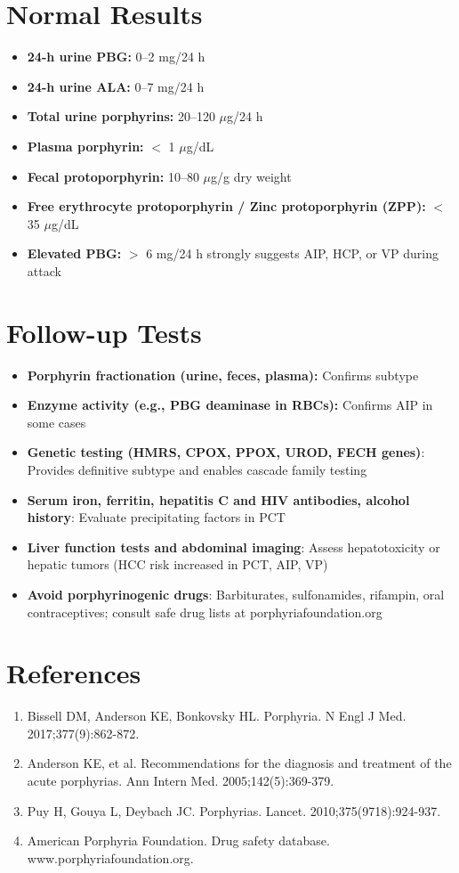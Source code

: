 \section*{Normal Results}
\begin{itemize}
  \item \textbf{24-h urine PBG:} 0--2 mg/24 h
  \item \textbf{24-h urine ALA:} 0--7 mg/24 h
  \item \textbf{Total urine porphyrins:} 20--120 $\mu$g/24 h
  \item \textbf{Plasma porphyrin:} $<$ 1 $\mu$g/dL
  \item \textbf{Fecal protoporphyrin:} 10--80 $\mu$g/g dry weight
  \item \textbf{Free erythrocyte protoporphyrin / Zinc protoporphyrin (ZPP):} $<$ 35 $\mu$g/dL
  \item \textbf{Elevated PBG:} $>$ 6 mg/24 h strongly suggests AIP, HCP, or VP during attack
\end{itemize}

\section*{Follow-up Tests}
\begin{itemize}
  \item \textbf{Porphyrin fractionation (urine, feces, plasma):} Confirms subtype
  \item \textbf{Enzyme activity (e.g., PBG deaminase in RBCs):} Confirms AIP in some cases
  \item \textbf{Genetic testing (HMRS, CPOX, PPOX, UROD, FECH genes)}: Provides definitive subtype and enables cascade family testing
  \item \textbf{Serum iron, ferritin, hepatitis C and HIV antibodies, alcohol history}: Evaluate precipitating factors in PCT
  \item \textbf{Liver function tests and abdominal imaging}: Assess hepatotoxicity or hepatic tumors (HCC risk increased in PCT, AIP, VP)
  \item \textbf{Avoid porphyrinogenic drugs}: Barbiturates, sulfonamides, rifampin, oral contraceptives; consult safe drug lists at porphyriafoundation.org
\end{itemize}

\section*{References}
\begin{enumerate}
  \item Bissell DM, Anderson KE, Bonkovsky HL. Porphyria. N Engl J Med. 2017;377(9):862-872.
  \item Anderson KE, et al. Recommendations for the diagnosis and treatment of the acute porphyrias. Ann Intern Med. 2005;142(5):369-379.
  \item Puy H, Gouya L, Deybach JC. Porphyrias. Lancet. 2010;375(9718):924-937.
  \item American Porphyria Foundation. Drug safety database. www.porphyriafoundation.org.
\end{enumerate}

\clearpage